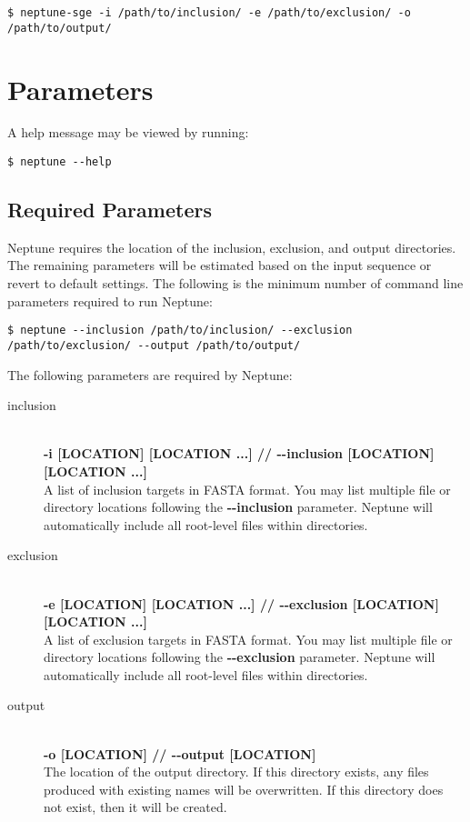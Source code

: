 \documentclass[a4paper,10pt]{article}
\begin{document}
\begin{lstlisting}[title={SGE Example}]
$ neptune-sge -i /path/to/inclusion/ -e /path/to/exclusion/ -o /path/to/output/
\end{lstlisting}

\newpage
\section{Parameters}

A help message may be viewed by running:

\begin{lstlisting}
$ neptune --help
\end{lstlisting}

\subsection{Required Parameters}

Neptune requires the location of the inclusion, exclusion, and output directories. The remaining parameters will be estimated based on the input sequence or revert to default settings. The following is the minimum number of command line parameters required to run Neptune:

\begin{lstlisting}
$ neptune --inclusion /path/to/inclusion/ --exclusion /path/to/exclusion/ --output /path/to/output/
\end{lstlisting}

The following parameters are required by Neptune:

\begin{description}

  \item[inclusion] \hfill \\
  \textbf{-i [LOCATION] [LOCATION ...] // -{}-inclusion [LOCATION] [LOCATION ...]} \hfill \\
  A list of inclusion targets in FASTA format. You may list multiple file or directory locations following the \textbf{-{}-inclusion} parameter. Neptune will automatically include all root-level files within directories.  
  
  \item[exclusion] \hfill \\
  \textbf{-e [LOCATION] [LOCATION ...] // -{}-exclusion [LOCATION] [LOCATION ...]} \hfill \\
  A list of exclusion targets in FASTA format. You may list multiple file or directory locations following the \textbf{-{}-exclusion} parameter. Neptune will automatically include all root-level files within directories.
  
  \item[output] \hfill \\
  \textbf{-o [LOCATION] // -{}-output [LOCATION]} \hfill \\
  The location of the output directory. If this directory exists, any files produced with existing names will be overwritten. If this directory does not exist, then it will be created.
  
\end{description}
\end{document}
